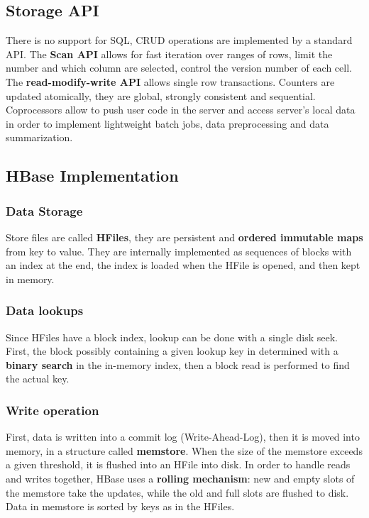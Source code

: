 	\subsection{Storage API}
	There is no support for SQL, CRUD operations are implemented by a standard API.\newline
	The \textbf{Scan API} allows for fast iteration over ranges of rows, limit the number and which column are selected, control the version number of each cell.\newline
	The \textbf{read-modify-write API} allows single row  transactions.\newline
	\newline
	Counters are updated atomically, they are global, strongly consistent and sequential.\newline
	Coprocessors allow to push user code in the server and access server's local data in order to implement lightweight batch jobs, data preprocessing and data summarization.
	\subsection{HBase Implementation}
		\subsubsection{Data Storage}
		Store files are called \textbf{HFiles}, they are persistent and \textbf{ordered immutable maps} from key to value.\newline
		They are internally implemented as sequences of blocks with an index at the end, the index is loaded when the HFile is opened, and then kept in memory.
		\subsubsection{Data lookups}
		Since HFiles have a block index, lookup can be done with a single disk seek. First, the block possibly containing a given lookup key in determined with a \textbf{binary search} in the in-memory index, then a block read is performed to find the actual key.
		\subsubsection{Write operation}
		First, data is written into a commit log (Write-Ahead-Log), then it is moved into memory, in a structure called \textbf{memstore}. When the size of the memstore exceeds a given threshold, it is flushed into an HFile into disk.\newline
		\newline
		In order to handle reads and writes together, HBase uses a \textbf{rolling mechanism}: new and empty slots of the memstore take the updates, while the old and full slots are flushed to disk.\newline
		Data in memstore is sorted by keys as in the HFiles.
